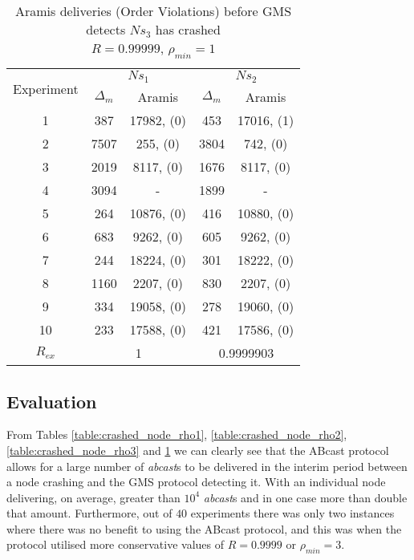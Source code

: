 \begin{table}[p]
    \begin{center}
        \renewcommand{\arraystretch}{1.25}
        \begin{tabular}{|c|c|c|c|c|}
            \hline
            \multirow{2}{*}{Experiment} & \multicolumn{2}{|c|}{$Ns_1$} & \multicolumn{2}{|c|}{$Ns_2$} \\ \cline{2-5}
                                                       & $\Delta_m$&\textsf{Aramis} & $\Delta_m$&\textsf{Aramis} \\ \hline \hline
            1 & 387 & 17982, (0) & 453 & 17016, (1)  \\ \hline
            2 & 7507 & 255, (0) & 3804 & 742, (0)  \\ \hline
            3 & 2019 & 8117, (0) & 1676 & 8117, (0)  \\ \hline
            4 & 3094 & - & 1899 & -  \\ \hline
            5 & 264 & 10876, (0) & 416 & 10880, (0)  \\ \hline
            6 & 683 & 9262, (0) & 605 & 9262, (0)  \\ \hline
            7 & 244 & 18224, (0) & 301 & 18222, (0)  \\ \hline
            8 & 1160 & 2207, (0) & 830 & 2207, (0)  \\ \hline
            9 & 334 & 19058, (0) & 278 & 19060, (0)  \\ \hline
            10 & 233 & 17588, (0) & 421 & 17586, (0)  \\ \hline \hline
            $R_{ex}$ & \multicolumn{2}{|c|}{1} & \multicolumn{2}{|c|}{0.9999903} \\ \hline

        \end{tabular}
        \caption[\textsf{Aramis} deliveries before GMS detects node crash ($R=0.99999$, $\rho_{min}=1$)]{\textsf{Aramis} deliveries (Order Violations) before GMS detects $Ns_3$ has crashed \\ $R=0.99999$, $\rho_{min}=1$}
        \label{table:crashed_node_R.99999}
    \end{center}
\end{table}

    \subsection{Evaluation}
    From Tables \ref{table:crashed_node_rho1}, \ref{table:crashed_node_rho2},  \ref{table:crashed_node_rho3} and \ref{table:crashed_node_R.99999} we can clearly see that the \textsf{ABcast} protocol allows for a large number of \emph{abcast}s to be delivered in the interim period between a node crashing and the GMS protocol detecting it.  With an individual node delivering, on average, greater than $10^4$ \emph{abcast}s and in one case more than double that amount.  Furthermore, out of $40$ experiments there was only two instances where there was no benefit to using the \textsf{ABcast} protocol, and this was when the protocol utilised more conservative values of $R=0.9999$ or $\rho_{min}=3$.  
    
